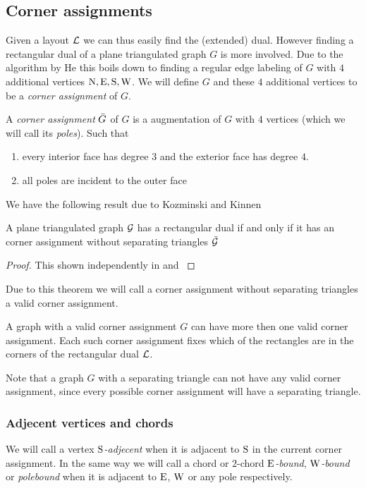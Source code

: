 \subsection{Corner assignments}

  Given a layout $\mathcal{L}$ we can thus easily find the (extended) dual. However finding a rectangular dual of a plane triangulated graph $G$ is more involved. Due to the algorithm by He \cite{He1993} this boils down to finding a regular edge labeling of $G$ with $4$ additional vertices $\mathrm{N}, \mathrm{E}, \mathrm{S}, \mathrm{W}$. We will define $G$ and these $4$ additional vertices to be a \emph{corner assignment} of $G$.

  \begin{defi}
    A \emph{corner assignment} $\bar{G}$ of $G$ is a augmentation of $G$ with $4$ vertices (which we will call its \emph{poles}). Such that
    \begin{enumerate}
    \item every interior face has degree $3$ and the exterior face has degree $4$.
    \item all poles are incident to the outer face
    \end{enumerate}
  \end{defi}

  We have the following result due to Kozminski and Kinnen

  \begin{thrm}
    \label{th:rect:exsitenceREctangularDual}
    A plane triangulated graph $\mathcal{G}$ has a rectangular dual if and only if it has an corner assignment without separating triangles $\bar{\mathcal{G}}$
  \end{thrm}

  \begin{proof}
    This shown independently in \cite{Kozminski1984} and  \cite{Ungar1953}
  \end{proof}

  Due to this theorem we will call a corner assignment without separating triangles a valid corner assignment.

  A graph with a valid corner assignment $G$ can have more then one valid corner assignment. Each such corner assignment fixes which of the rectangles are in the corners of the rectangular dual $\mathcal{L}$.

  Note that a graph $G$ with a separating triangle can not have any valid corner assignment, since every possible corner assignment will have a separating triangle.

  \subsubsection{Adjecent vertices and chords}
  We will call a vertex \emph{$\mathrm{S}$-adjecent} when it is adjacent to $\mathrm{S}$ in the current corner assignment. In the same way we will call a chord or $2$-chord \emph{$\mathrm{E}$-bound}, \emph{$\mathrm{W}$-bound} or \emph{polebound} when it is adjacent to $\mathrm{E}$, $\mathrm{W}$ or any pole respectively.
